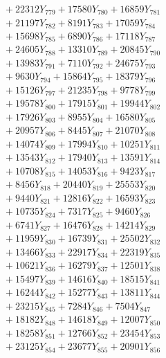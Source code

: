 \documentclass[a4paper,10pt]{article}
\begin{document}
{\begin{align}
&\;  + 22312 Y_{779} + 17580 Y_{780} + 16859 Y_{781} \\[0.3ex]
&\;  + 21197 Y_{782} + 8191 Y_{783} + 17059 Y_{784} \\[0.3ex]
&\;  + 15698 Y_{785} + 6890 Y_{786} + 17118 Y_{787} \\[0.3ex]
&\;  + 24605 Y_{788} + 13310 Y_{789} + 20845 Y_{790} \\[0.3ex]
&\;  + 13983 Y_{791} + 7110 Y_{792} + 24675 Y_{793} \\[0.3ex]
&\;  + 9630 Y_{794} + 15864 Y_{795} + 18379 Y_{796} \\[0.3ex]
&\;  + 15126 Y_{797} + 21235 Y_{798} + 9778 Y_{799} \\[0.3ex]
&\;  + 19578 Y_{800} + 17915 Y_{801} + 19944 Y_{802} \\[0.3ex]
&\;  + 17926 Y_{803} + 8955 Y_{804} + 16580 Y_{805} \\[0.3ex]
&\;  + 20957 Y_{806} + 8445 Y_{807} + 21070 Y_{808} \\[0.5ex]\allowbreak
&\;  + 14074 Y_{809} + 17994 Y_{810} + 10251 Y_{811} \\[0.3ex]
&\;  + 13543 Y_{812} + 17940 Y_{813} + 13591 Y_{814} \\[0.3ex]
&\;  + 10708 Y_{815} + 14053 Y_{816} + 9423 Y_{817} \\[0.3ex]
&\;  + 8456 Y_{818} + 20440 Y_{819} + 25553 Y_{820} \\[0.3ex]
&\;  + 9440 Y_{821} + 12816 Y_{822} + 16593 Y_{823} \\[0.3ex]
&\;  + 10735 Y_{824} + 7317 Y_{825} + 9460 Y_{826} \\[0.3ex]
&\;  + 6741 Y_{827} + 16476 Y_{828} + 14214 Y_{829} \\[0.3ex]
&\;  + 11959 Y_{830} + 16739 Y_{831} + 25502 Y_{832} \\[0.3ex]
&\;  + 13466 Y_{833} + 22917 Y_{834} + 22319 Y_{835} \\[0.3ex]
&\;  + 10621 Y_{836} + 16279 Y_{837} + 12501 Y_{838} \\[0.5ex]\allowbreak
&\;  + 15497 Y_{839} + 14616 Y_{840} + 18515 Y_{841} \\[0.3ex]
&\;  + 16244 Y_{842} + 15277 Y_{843} + 13811 Y_{844} \\[0.3ex]
&\;  + 23215 Y_{845} + 7284 Y_{846} + 7504 Y_{847} \\[0.3ex]
&\;  + 18182 Y_{848} + 14618 Y_{849} + 12007 Y_{850} \\[0.3ex]
&\;  + 18258 Y_{851} + 12766 Y_{852} + 23454 Y_{853} \\[0.3ex]
&\;  + 23125 Y_{854} + 23677 Y_{855} + 20901 Y_{856} \\[0.3ex]

\end{align}}
\end{document}
